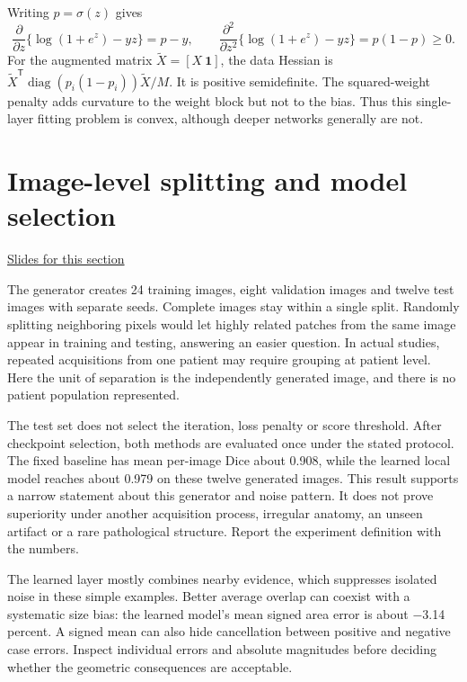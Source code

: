\documentclass[11pt,letterpaper]{article}
\theoremstyle{definition}\newtheorem{definition}{Definition}\newtheorem{example}{Example}
\numberwithin{equation}{section}
\begin{document}
Writing $p=\sigma(z)$ gives
\[
 \frac{\partial}{\partial z}\{\log(1+e^z)-yz\}=p-y,
 \qquad\frac{\partial^2}{\partial z^2}\{\log(1+e^z)-yz\}=p(1-p)\ge0.
\]
For the augmented matrix $\widetilde X=[X\ \boldsymbol1]$, the data Hessian is $\widetilde X^{\mathsf T}\operatorname{diag}(p_i(1-p_i))\widetilde X/M$. It is positive semidefinite. The squared-weight penalty adds curvature to the weight block but not to the bias. Thus this single-layer fitting problem is convex, although deeper networks generally are not.
\section{Image-level splitting and model selection}
\hypertarget{note-image-level-splitting-and-model-selection}{}\label{note:image-level-splitting-and-model-selection}
{\small \href{slides.html\#frame=the-unit-of-separation-panel-1\&step=1}{Slides for this section}}\par
The generator creates 24 training images, eight validation images and twelve test images with separate seeds. Complete images stay within a single split. Randomly splitting neighboring pixels would let highly related patches from the same image appear in training and testing, answering an easier question. In actual studies, repeated acquisitions from one patient may require grouping at patient level. Here the unit of separation is the independently generated image, and there is no patient population represented.

The test set does not select the iteration, loss penalty or score threshold. After checkpoint selection, both methods are evaluated once under the stated protocol. The fixed baseline has mean per-image Dice about 0.908, while the learned local model reaches about 0.979 on these twelve generated images. This result supports a narrow statement about this generator and noise pattern. It does not prove superiority under another acquisition process, irregular anatomy, an unseen artifact or a rare pathological structure. Report the experiment definition with the numbers.

The learned layer mostly combines nearby evidence, which suppresses isolated noise in these simple examples. Better average overlap can coexist with a systematic size bias: the learned model's mean signed area error is about \ensuremath{-}3.14 percent. A signed mean can also hide cancellation between positive and negative case errors. Inspect individual errors and absolute magnitudes before deciding whether the geometric consequences are acceptable.
\end{document}
